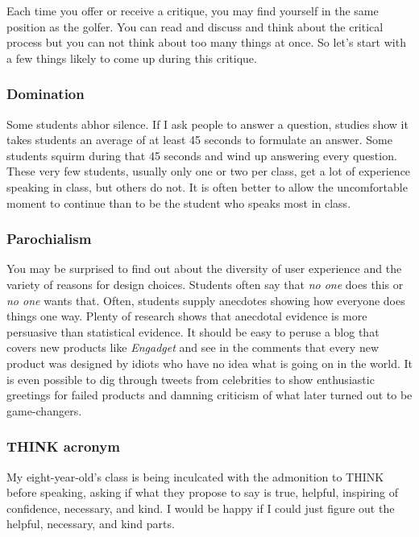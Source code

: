 Each time you offer or receive a critique, you may find yourself in the
same position as the golfer. You can read and discuss and think about
the critical process but you can not think about too many things at
once. So let's start with a few things likely to come up during this
critique.

\hypertarget{domination}{%
\subsubsection{Domination}\label{domination}}

Some students abhor silence. If I ask people to answer a question,
studies show it takes students an average of at least 45 seconds to
formulate an answer. Some students squirm during that 45 seconds and
wind up answering every question. These very few students, usually only
one or two per class, get a lot of experience speaking in class, but
others do not. It is often better to allow the uncomfortable moment to
continue than to be the student who speaks most in class.

\hypertarget{parochialism}{%
\subsubsection{Parochialism}\label{parochialism}}

You may be surprised to find out about the diversity of user experience
and the variety of reasons for design choices. Students often say that
\emph{no one} does this or \emph{no one} wants that. Often, students
supply anecdotes showing how everyone does things one way. Plenty of
research shows that anecdotal evidence is more persuasive than
statistical evidence. It should be easy to peruse a blog that covers new
products like \emph{Engadget} and see in the comments that every new
product was designed by idiots who have no idea what is going on in the
world. It is even possible to dig through tweets from celebrities to
show enthusiastic greetings for failed products and damning criticism of
what later turned out to be game-changers.

\hypertarget{think-acronym}{%
\subsubsection{THINK acronym}\label{think-acronym}}

My eight-year-old's class is being inculcated with the admonition to
THINK before speaking, asking if what they propose to say is true,
helpful, inspiring of confidence, necessary, and kind. I would be happy
if I could just figure out the helpful, necessary, and kind parts.


